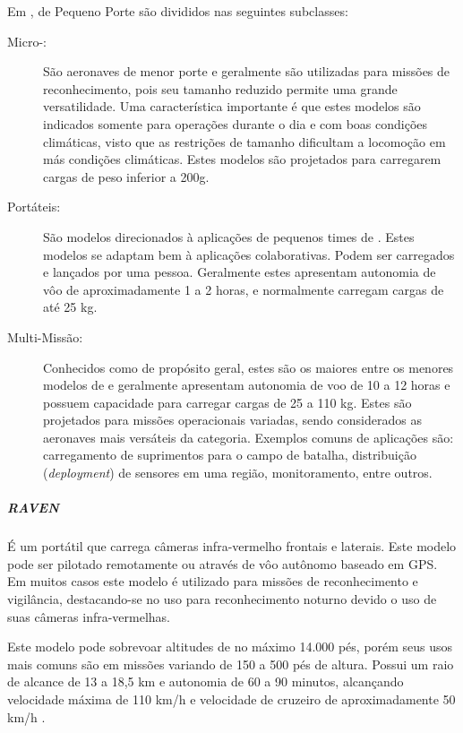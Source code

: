 Em \cite{Drew2005}, \vants de Pequeno Porte são divididos nas seguintes subclasses:

\begin{description}

\item[Micro-\vants: ]
São aeronaves de menor porte e geralmente são utilizadas para missões de reconhecimento, pois seu tamanho reduzido permite uma grande versatilidade. Uma característica importante é que estes modelos são indicados somente para operações durante o dia e com boas condições climáticas, visto que as restrições de tamanho dificultam a locomoção em más condições climáticas. Estes modelos são projetados para carregarem cargas de peso inferior a 200g.

\item[Portáteis: ]
São modelos direcionados à aplicações de pequenos times de \vants. Estes modelos se adaptam bem à aplicações colaborativas. Podem ser carregados e lançados por uma pessoa. Geralmente estes \vants apresentam autonomia de vôo de aproximadamente 1 a 2 horas, e normalmente carregam cargas de até 25 kg.

\item[Multi-Missão: ]
Conhecidos como \vants  de propósito geral, estes são os maiores entre os menores modelos de \vants e geralmente apresentam autonomia de voo de 10 a 12 horas e possuem capacidade para carregar cargas de 25 a 110 kg. Estes \vants são projetados para missões operacionais variadas, sendo considerados as aeronaves mais versáteis da categoria. Exemplos comuns de aplicações são: carregamento de suprimentos para o campo de batalha, distribuição (\emph{deployment}) de sensores em uma região, monitoramento, entre outros.

\end{description}


\subparagraph{\emph{RAVEN}}
É um \vant portátil que carrega câmeras infra-vermelho frontais e laterais. Este modelo pode ser pilotado remotamente ou através de vôo autônomo baseado em GPS. Em muitos casos 
este modelo é utilizado para missões de reconhecimento e vigilância, destacando-se no uso para reconhecimento noturno devido o uso de suas câmeras infra-vermelhas.

Este modelo pode sobrevoar altitudes de no máximo 14.000 pés, porém seus usos mais comuns são em missões variando de 150 a 500 pés de altura. Possui um raio de alcance de 
13 a 18,5 km e autonomia de 60 a 90 minutos, alcançando velocidade máxima de 110 km/h e velocidade de cruzeiro de aproximadamente 50 km/h \cite{uas_2009}. 

